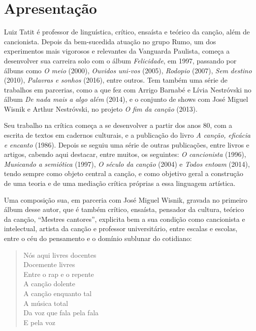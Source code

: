 \chapter{Apresentação}

Luiz Tatit é professor de linguística, crítico, ensaísta e teórico da
canção, além de cancionista. Depois da bem-sucedida atuação no grupo
Rumo, um dos experimentos mais vigorosos e relevantes da Vanguarda
Paulista, começa a desenvolver sua carreira solo com o álbum
\textit{Felicidade}, em 1997, passando por álbuns como \textit{O meio} (2000),
\textit{Ouvidos uni-vos} (2005), \textit{Rodopio} (2007), \textit{Sem destino} (2010),
\textit{Palavras e sonhos} (2016), entre outros. Tem também uma série de
trabalhos em parcerias, como a que fez com Arrigo Barnabé e Lívia
Nestróvski no álbum \textit{De nada mais a algo além} (2014), e o conjunto de shows com
José Miguel Wisnik e Arthur Nestróvski, no projeto \textit{O fim da canção}
(2013).

Seu trabalho na crítica começa a se desenvolver a partir dos anos 80,
com a escrita de textos em cadernos culturais, e a publicação do livro
\textit{A canção, eficácia e encanto} (1986). Depois se seguiu uma série de
outras publicações, entre livros e artigos, cabendo aqui destacar, entre
muitos, os seguintes: \textit{O cancionista} (1996), \textit{Musicando a
semiótica} (1997), \textit{O século da canção} (2004) e \textit{Todos entoam}
(2014), tendo sempre como objeto central a canção, e como objetivo geral
a construção de uma teoria e de uma mediação crítica próprias a essa
linguagem artística.

Uma composição sua, em parceria com José Miguel Wisnik, gravada no
primeiro álbum desse autor, que é também crítico, ensaísta, pensador da
cultura, teórico da canção, ``Mestres cantores'', explicita bem a sua
condição como cancionista e intelectual, artista da canção e professor
universitário, entre escalas e escolas, entre o céu do pensamento e o
domínio sublunar do cotidiano:

\begin{verse}
Nós aqui livres docentes\\
Docemente livres\\
Entre o rap e o repente\\
A canção dolente\\
A canção enquanto tal\\
A música total\\
Da voz que fala pela fala\\
E pela voz
\end{verse}

